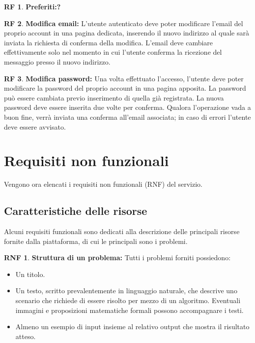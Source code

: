 \documentclass[11pt, a4paper]{article}
\theoremstyle{definition}
\newtheorem{funcreq}{RF} %
\newtheorem{nonfuncreq}{RNF} %
\begin{document}
\begin{funcreq}
\textbf{Preferiti:?}

\end{funcreq}

\begin{funcreq}
\textbf{Modifica email:}
L'utente autenticato deve poter modificare l'email del proprio account in
una pagina dedicata, inserendo il nuovo indirizzo al quale sarà inviata la
richiesta di conferma della modifica. L'email deve cambiare effettivamente solo nel momento in cui l'utente conferma la ricezione del messaggio presso il
nuovo indirizzo.
\end{funcreq}

\begin{funcreq}
\textbf{Modifica password:}
Una volta effettuato l'accesso, l'utente deve poter modificare la password del
proprio account in una pagina apposita. La password può essere cambiata previo
inserimento di quella già registrata. La nuova password deve essere inserita
due volte per conferma. Qualora l'operazione vada a buon fine, verrà inviata
una conferma all'email associata; in caso di errori l'utente deve essere
avvisato.
\end{funcreq}


\newpage
\section{Requisiti non funzionali}
Vengono ora elencati i requisiti non funzionali (RNF) del servizio.

\subsection{Caratteristiche delle risorse}
Alcuni requisiti funzionali sono dedicati alla descrizione delle principali
risorse fornite dalla piattaforma, di cui le principali sono i problemi.

\begin{nonfuncreq}
\label{formatoproblema}
\textbf{Struttura di un problema:}
Tutti i problemi forniti possiedono:
\begin{itemize}
    \item Un titolo.

    \item Un testo, scritto prevalentemente in linguaggio naturale,
    che descrive uno scenario che richiede di essere risolto per mezzo
    di un algoritmo. Eventuali immagini e proposizioni matematiche
    formali possono accompagnare i testi.

    \item Almeno un esempio di input insieme al relativo output che
    mostra il risultato atteso.
\end{itemize}
\end{nonfuncreq}
\end{document}
